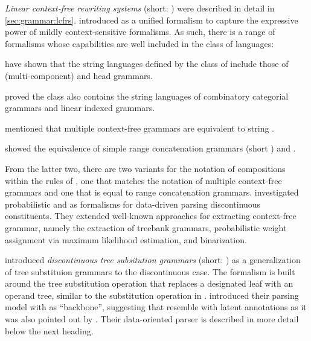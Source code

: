 \documentclass[../document.tex]{subfiles}
\begin{document}
    \emph{Linear context-free rewriting systems} (short: ) were described in detail in \cref{sec:grammar:lcfrs}.
    \citet{VijWeiJos87,Weir88} introduced  as a unified formalism to capture the expressive power of mildly context-sensitive formalisms.
    As such, there is a range of formalisms whose capabilities are well included in the class of  languages:
    \begin{compactitem}
        \item \citet{VijWeiJos87} have shown that the string languages defined by the class of  include those of (multi-component)  and head grammars.
        \item \citet{vijay1994equivalence} proved the class also contains the string languages of combinatory categorial grammars and linear indexed grammars.
        \item \citet{SekMatFujKas91} mentioned that multiple context-free grammars are equivalent to string .
        \item \citet{boullier1998proposal} showed the equivalence of simple range concatenation grammars (short ) and .
    \end{compactitem}
    From the latter two, there are two variants for the notation of compositions within the rules of , one that matches the notation of multiple context-free grammars and one that is equal to range concatenation grammars.
    \citet{MaierSogaard08,MailKal10} investigated probabilistic  and  as formalisms for data-driven parsing discontinuous constituents.
    They extended well-known approaches for extracting context-free grammar, namely the extraction of treebank grammars, probabilistic weight assignment via maximum likelihood estimation, and binarization.
    
    \citet{CraSchBod16} introduced \emph{discontinuous tree subsitution grammars} (short: ) as a generalization of tree substituion grammars \citep{} to the discontinuous case.
    The formalism is built around the tree substitution operation that replaces a designated leaf with an operand tree, similar to the substitution operation in .
    \citet{Cra11} introduced their parsing model with  as ``backbone'', suggesting that  resemble  with latent annotations as it was also pointed out by \citet[Section 8.5.1]{Geb20}.
    Their data-oriented parser is described in more detail below the next heading.
\end{document}
